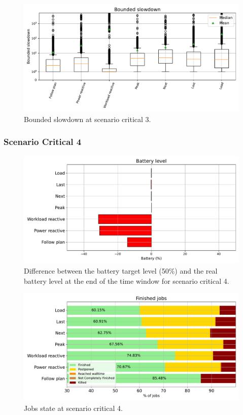 \begin{figure}[!htb]
    \centering
    \includegraphics[scale=0.55]{Images/Compensations/slowdown_critical_3.pdf}
    \caption{Bounded slowdown at scenario critical 3.}
    \label{fig:slowdown_critical_3}
\end{figure}

\clearpage

\subsubsection{Scenario Critical 4}

\begin{figure}[!htb]
    \centering
    \includegraphics[scale=0.55]{Images/Compensations/battery_critical_4.pdf}
    \caption{Difference between the battery target level (50\%) and the real battery level at the end of the time window for scenario critical 4.}
    \label{fig:SoC_critical_4}
\end{figure}

\begin{figure}[!htb]
    \centering
    \includegraphics[scale=0.55]{Images/Compensations/jobs_critical_4.pdf}
    \caption{Jobs state at scenario critical 4.}
    \label{fig:jobs_critical_4}
\end{figure}

